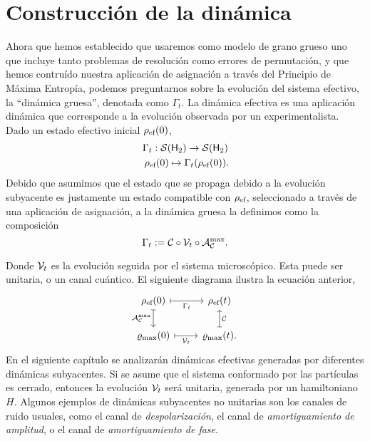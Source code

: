 \section{Construcción de la dinámica}\label{sec:ch2dycon}

Ahora que hemos establecido que usaremos como modelo de grano grueso uno que incluye tanto problemas de resolución como errores de permutación, y que hemos contruído nuestra aplicación de asignación a través del Principio de Máxima Entropía, podemos preguntarnos sobre la evolución del sistema efectivo, la ``dinámica gruesa'', denotada como $\Gamma_t$. La dinámica efectiva es una aplicación dinámica que corresponde a la evolución observada por un experimentalista. Dado un estado efectivo inicial $\rho_{\text{ef}}(0)$,
\begin{gather}
\Gamma_{t}:\mcS(\hilbert_2)\rightarrow \mcS(\hilbert_2)\nonumber\\
\rho_{\ef}(0) \mapsto \Gamma_{t}(\rho_{\ef}(0))\rlap{.}\nonumber
\end{gather}
Debido que asumimos que el estado que se propaga debido a la evolución subyacente es justamente un estado compatible con $\rho_{\text{ef}}$, seleccionado a través de una aplicación de asignación, a la dinámica gruesa la definimos como la composición
\begin{equation}
\Gamma_t:=\mathcal{C} \circ \mathcal{V}_t \circ \mathcal{A}_{\mathcal{C}}^{\max}.\nonumber
\end{equation}


Donde $\mathcal{V}_{t}$ es la evolución seguida por el sistema microscópico. Esta puede ser unitaria, o un canal cuántico. El siguiente diagrama ilustra la ecuación anterior,
\[\begin{tikzcd}[arrows={<-|}]
    \rho_{\ef}(0)  & \rho_{\ef}(t) \arrow{l}{\Gamma_{t}} \arrow{d}{\mcC}\\
\varrho_{\max}(0) \arrow{u}{\mcA_{\mcC}^{\max}} & \varrho_{\max}(t). \arrow{l}{\mcV_{t}}
\end{tikzcd}
\]
En el siguiente capítulo se analizarán dinámicas efectivas generadas por diferentes dinámicas subyacentes. Si se asume que el sistema conformado por las partículas es cerrado, entonces la evolución $\mathcal{V}_{t}$ será unitaria, generada por un hamiltoniano $H$. Algunos ejemplos de dinámicas subyacentes no unitarias son los canales de ruido usuales, como el canal de \textit{despolarización}, el canal de \textit{amortiguamiento de amplitud}, o el canal de \textit{amortiguamiento de fase}. 


